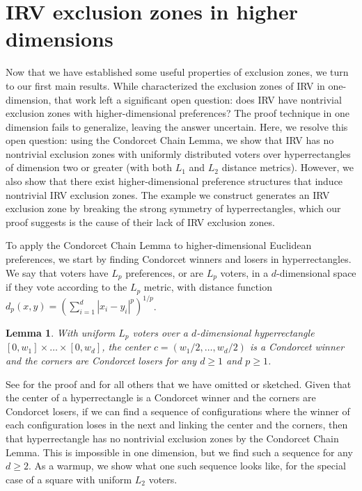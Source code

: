 \documentclass{article}
\theoremstyle{theorem}
\newtheorem{lemma}{Lemma}
\theoremstyle{definition}
\begin{document}
\section{IRV exclusion zones in higher dimensions}
\label{sec:irv_higher_dim}
Now that we have established some useful properties of exclusion zones, we turn to our first main results. While \citet{tomlinson2024moderating} characterized the exclusion zones of IRV in one-dimension, that work left a significant open question: does IRV have nontrivial exclusion zones with higher-dimensional preferences? The proof technique in one dimension fails to generalize, leaving the answer uncertain. Here, we resolve this open question: using the Condorcet Chain Lemma, we show that IRV has no nontrivial exclusion zones with uniformly distributed voters over hyperrectangles of dimension two or greater (with both $L_1$ and $L_2$ distance metrics). However, we also show that there exist higher-dimensional preference structures that induce nontrivial IRV exclusion zones. The example we construct generates an IRV exclusion zone by breaking the strong symmetry of hyperrectangles, which our proof suggests is the cause of their lack of IRV exclusion zones.  

To apply the Condorcet Chain Lemma to higher-dimensional Euclidean preferences, we start by finding Condorcet winners and losers in hyperrectangles. We say that voters have $L_p$ preferences, or are $L_p$ voters, in a $d$-dimensional space if they vote according to the $L_p$ metric, with distance function $d_p(x, y) =\left(\sum_{i = 1}^d |x_i - y_i|^p\right)^{1/p}$.  

\begin{lemma}\label{lemma:hyperrect-condorcet}
  With uniform $L_p$ voters over a $d$-dimensional hyperrectangle $[0, w_1]\times\dots \times [0, w_d]$, the center $c = (w_1/2, \dots, w_d/2)$ is a Condorcet winner and the corners are Condorcet losers for any $d \ge 1$ and $p \ge 1$. 
\end{lemma}
See  for the proof and for all others that we have omitted or sketched. Given that the center of a hyperrectangle is a Condorcet winner and the corners are Condorcet losers, if we can find a sequence of configurations where the winner of each configuration loses in the next and linking the center and the corners, then that hyperrectangle has no nontrivial exclusion zones by the Condorcet Chain Lemma. This is impossible in one dimension, but we find such a sequence for any $d \ge 2$. As a warmup, we show what one such sequence looks like, for the special case of a square with uniform $L_2$ voters.
\end{document}
